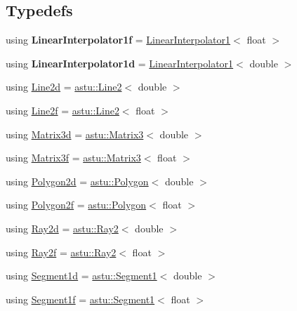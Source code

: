 \subsection*{Typedefs}
\begin{DoxyCompactItemize}
\item 
\mbox{\label{namespaceastu_ab9526f53982f2d507428404f03131aad}} 
using {\bfseries Linear\+Interpolator1f} = \hyperlink{classastu_1_1LinearInterpolator1}{Linear\+Interpolator1}$<$ float $>$
\item 
\mbox{\label{namespaceastu_a6969200055ae631ef6ac31d242ef21d5}} 
using {\bfseries Linear\+Interpolator1d} = \hyperlink{classastu_1_1LinearInterpolator1}{Linear\+Interpolator1}$<$ double $>$
\item 
using \hyperlink{namespaceastu_a9e9519d311982af417c5b7fd50fb4515}{Line2d} = \hyperlink{classastu_1_1Line2}{astu\+::\+Line2}$<$ double $>$
\item 
using \hyperlink{namespaceastu_a6fbecdd0d3f742bdde8f5c000c3a8b5d}{Line2f} = \hyperlink{classastu_1_1Line2}{astu\+::\+Line2}$<$ float $>$
\item 
using \hyperlink{namespaceastu_a4453ec0de4066f92d38c78701b52c148}{Matrix3d} = \hyperlink{classastu_1_1Matrix3}{astu\+::\+Matrix3}$<$ double $>$
\item 
using \hyperlink{namespaceastu_a59c09794d42987e02b85ce8ccb2de101}{Matrix3f} = \hyperlink{classastu_1_1Matrix3}{astu\+::\+Matrix3}$<$ float $>$
\item 
using \hyperlink{namespaceastu_abc60e44721faec63659fd29e46d21522}{Polygon2d} = \hyperlink{classastu_1_1Polygon}{astu\+::\+Polygon}$<$ double $>$
\item 
using \hyperlink{namespaceastu_a39ca0cd425ff5edd2a090d6997ce8c2a}{Polygon2f} = \hyperlink{classastu_1_1Polygon}{astu\+::\+Polygon}$<$ float $>$
\item 
using \hyperlink{namespaceastu_a37ce0df4f800cdda11a64fa7d936a25d}{Ray2d} = \hyperlink{classastu_1_1Ray2}{astu\+::\+Ray2}$<$ double $>$
\item 
using \hyperlink{namespaceastu_aa8986be7101408a7fbfdd07c73ecf8cb}{Ray2f} = \hyperlink{classastu_1_1Ray2}{astu\+::\+Ray2}$<$ float $>$
\item 
using \hyperlink{namespaceastu_a3ed894c1b9f965fa9905c6f5a71ab5d4}{Segment1d} = \hyperlink{classastu_1_1Segment1}{astu\+::\+Segment1}$<$ double $>$
\item 
using \hyperlink{namespaceastu_adaf20507cd638f02e10a5437a9810623}{Segment1f} = \hyperlink{classastu_1_1Segment1}{astu\+::\+Segment1}$<$ float $>$

\end{DoxyCompactItemize}
